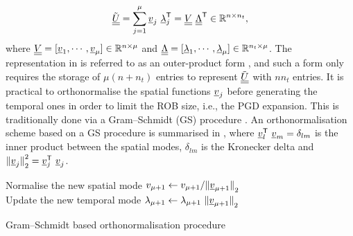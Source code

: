 \begin{equation}
	{\tilde{\underline{\underline{U}}}} = \displaystyle \sum_{j=1}^{\mu} \underline{v}_j \ {\underline{\lambda}}^{\sf T}_j = \underline{\underline{V}} \ {\underline{\underline{\Lambda}}}^{\sf T} \in {\mathbb{ R}}^{n\times n_t},
	\label{eq_outer_prod}
\end{equation}
where $\underline{\underline{V}}=[\underline{v}_1,\cdots,\underline{v}_{\mu}] \in {\mathbb{ R}}^{n\times \mu} $ and $\underline{\underline{\Lambda}}=[\underline{\lambda}_1,\cdots,\underline{\lambda}_{\mu}] \in {\mathbb{ R}}^{n_t \times \mu} $. The representation in  is referred to as an outer-product form \parencite{Bebendorf2008}, and such a form only requires the storage of $\mu(n+n_t)$ entries to represent ${\tilde{\underline{\underline{U}}}}$ with $n n_t$ entries. It is practical to orthonormalise the spatial functions $\underline{v}_j$ before generating the temporal ones in order to limit the ROB size, i.e., the PGD expansion. This is traditionally done via a Gram--Schmidt (GS) procedure \parencite{bha2017}. An orthonormalisation scheme based on a GS procedure is summarised in , where ${\underline{v}}^{\sf T}_l \ {\underline{v}}_m = \delta_{lm}$ is the inner product between the spatial modes, $\delta_{lm}$ is the Kronecker delta and ${\lVert{\vv_j}\rVert}_2^2=\T{\vv}_j \ {\vv}_j$.

\begin{algorithm}[hbt!]
	\vspace{0.2cm}
	\vspace{0.2cm}
	Normalise the new spatial mode $v_{\mu+1} \leftarrow v_{\mu+1}/{\lVert{\underline{v}_{\mu+1}}\rVert}_2$\\
	Update the new temporal mode $\lambda_{\mu+1} \leftarrow \lambda_{\mu+1} \ {\lVert{\underline{v}_{\mu+1}}\rVert}_2$
	\caption{Gram--Schmidt based orthonormalisation procedure}
	\label{alg:gramschmidt}
\end{algorithm}

